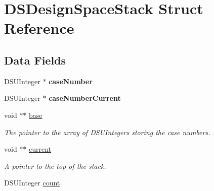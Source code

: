 \hypertarget{struct_d_s_design_space_stack}{
\section{DSDesignSpaceStack Struct Reference}
\label{struct_d_s_design_space_stack}
}
\subsection*{Data Fields}
\begin{DoxyCompactItemize}
\item 
\hypertarget{struct_d_s_design_space_stack_a16826c910c478e10e6058011089c3318}{
DSUInteger $\ast$ {\bfseries caseNumber}}
\label{struct_d_s_design_space_stack_a16826c910c478e10e6058011089c3318}

\item 
\hypertarget{struct_d_s_design_space_stack_a21ae974807506e3b4e1b7d5703ee3d16}{
DSUInteger $\ast$ {\bfseries caseNumberCurrent}}
\label{struct_d_s_design_space_stack_a21ae974807506e3b4e1b7d5703ee3d16}

\item 
\hypertarget{struct_d_s_design_space_stack_a249441016c880f0801b380bd22cedcc6}{
void $\ast$$\ast$ \hyperlink{struct_d_s_design_space_stack_a249441016c880f0801b380bd22cedcc6}{base}}
\label{struct_d_s_design_space_stack_a249441016c880f0801b380bd22cedcc6}

\begin{DoxyCompactList}\small\item\em The pointer to the array of DSUIntegers storing the case numbers. \item\end{DoxyCompactList}\item 
\hypertarget{struct_d_s_design_space_stack_ab6c47e43f38d68ed97c3f6c7973d1444}{
void $\ast$$\ast$ \hyperlink{struct_d_s_design_space_stack_ab6c47e43f38d68ed97c3f6c7973d1444}{current}}
\label{struct_d_s_design_space_stack_ab6c47e43f38d68ed97c3f6c7973d1444}

\begin{DoxyCompactList}\small\item\em A pointer to the top of the stack. \item\end{DoxyCompactList}\item 
\hypertarget{struct_d_s_design_space_stack_a6e9cf56a395f2344f3c8b59e09d6ae69}{
DSUInteger \hyperlink{struct_d_s_design_space_stack_a6e9cf56a395f2344f3c8b59e09d6ae69}{count}}
\label{struct_d_s_design_space_stack_a6e9cf56a395f2344f3c8b59e09d6ae69}


\end{DoxyCompactItemize}
